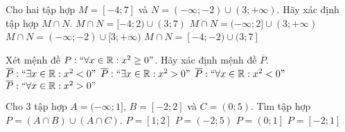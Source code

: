 \begin{ex}%
	Cho hai tập hợp $M=\left[-4;7\right]$ và $N=\left(-\infty;-2\right)\cup\left(3;+\infty\right)$. Hãy xác định tập hợp $M\cap N.$
	\choice
	{$M\cap N=[-4;2)\cup (3;7)$}
	{$M\cap N=(-\infty;2] \cup (3;+\infty)$}
	{$M\cap N=(-\infty;-2) \cup [3;+\infty)$}
	{\True $M\cap N=[-4;-2)\cup(3;7]$}
	
\end{ex}
\begin{ex}%
	Xét mệnh đề $P: \lq\lq\forall x\in\mathbb{R}: x^2\geq 0"$. Hãy xác định mệnh đề $\overline{P}.$
	\choice
	{\True $\overline{P}:\lq\lq\exists x\in\mathbb{R}: x^2<0"$}
	{$\overline{P}:\lq\lq\exists x\in\mathbb{R}: x^2>0"$}
	{$\overline{P}:\lq\lq\forall x\in\mathbb{R}: x^2<0"$}
	{$\overline{P}:\lq\lq\forall x\in\mathbb{R}: x^2>0"$}
\end{ex}
\begin{ex}%
	Cho 3 tập hợp $A=(-\infty;1]$, $B=[-2;2]$ và $C=(0;5)$. Tìm tập hợp $P=(A\cap B)\cup (A\cap C)$.
	\choice
	{$P=\left[1;2\right] $}
	{$P= \left(-2;5\right)$}
	{$ P=\left(0;1\right]$}
	{\True $P=\left[-2;1\right]$}
	\loigiai{
		Ta có $\heva{&A\cap B=[-2;1]\\&A\cap C=(0;1]}\Rightarrow P=(A\cap B)\cup (A\cap C)=\left[-2;1\right]$.
	}
\end{ex}
